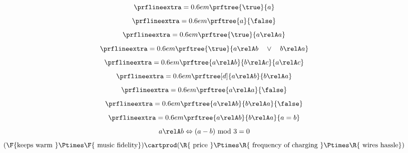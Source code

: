 {\begin{forslides}
\begin{equation}
        \end{equation}
        \begin{equation}
            \label{eq:top1}
            \prflineextra=0.6em
            \prftree{\true}{a}
        \end{equation}
        \begin{equation}
            \label{eq:bot1}
            \prflineextra=0.6em
            \prftree{a}{\false}
        \end{equation}
        \begin{equation}
            \label{eq:rel_refl}
            \prflineextra=0.6em
            \prftree{\true}{a\relA a}
        \end{equation}
        \begin{equation}
            \label{eq:rel_tot}
            \prflineextra=0.6em
            \prftree{\true}{a\relA b \quad \vee \quad b\relA a}
        \end{equation}
        \begin{equation}
            \label{eq:rel_tran}
            \prflineextra=0.6em
            \prftree{a\relA b}{b\relA c}{a\relA c}
        \end{equation}
        \begin{equation}
            \label{eq:rel_sym}
            \prflineextra=0.6em
            \prftree[d]{a \relA b}{b\relA a}
        \end{equation}
        \begin{equation}
            \label{eq:rel_irr}
            \prflineextra=0.6em
            \prftree{a \relA a}{\false}
        \end{equation}
        \begin{equation}
            \label{eq:rel_asy}
            \prflineextra=0.6em
            \prftree{a \relA b}{b\relA a}{\false}
        \end{equation}
        \begin{equation}
            \label{eq:rel_antisy}
            \prflineextra=0.6em
            \prftree{a \relA b}{b\relA a}{a=b}
        \end{equation}
        \begin{equation}
            \label{eq:ex}
            a\relA b \Leftrightarrow (a-b) \text{ mod }3=0
        \end{equation}
        \begin{equation}
            \label{eq:fun_cost}
            (\F{\text{keeps warm }}\Ptimes \F{\text{ music fidelity}})\cartprod(\R{\text{ price }} \Ptimes \R{\text{ frequency of charging }}\Ptimes \R{\text{ wires hassle}})

\end{equation}
\end{forslides}}
